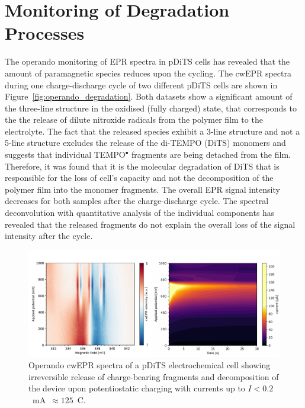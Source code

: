 \section{Monitoring of Degradation Processes}
\label{Degradation_study}
The operando monitoring of EPR spectra in pDiTS cells has revealed that the amount of paramagnetic species reduces upon the cycling. The cwEPR spectra during one charge-discharge cycle of two different pDiTS cells are shown in Figure~\ref{fig:operando_degradation}. Both datasets show a significant amount of the three-line structure in the oxidised (fully charged) state, that corresponds to the the release of dilute nitroxide radicals from the polymer film to the electrolyte. The fact that the released species exhibit a 3-line structure and not a 5-line structure excludes the release of the di-TEMPO (DiTS) monomers and suggests that individual TEMPO$^{\bullet}$ fragments are being detached from the film. Therefore, it was found that it is the molecular degradation of DiTS that is responsible for the loss of cell's capacity and not the decomposition of the polymer film into the monomer fragments. The overall EPR signal intensity decreases for both samples after the charge-discharge cycle. The spectral deconvolution with quantitative analysis of the individual components has revealed that the released fragments do not explain the overall loss of the signal intensity after the cycle.\\


\begin{figure}[!h]
\center
	\includegraphics[width=1\textwidth]{./operando_epr/figures/degradation/overnight_dits_201211_full_redox_contour_XY.pdf}
	\caption{Operando cwEPR spectra of a pDiTS electrochemical cell showing irreversible release of charge-bearing fragments and decomposition of the device upon potentiostatic charging with currents up to $I<0.2$~mA~$\approx125$~C.}
	\label{fig:operando_degradation_device}
\end{figure}


